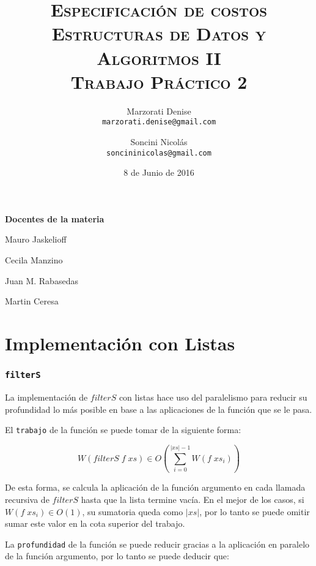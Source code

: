 \documentclass[a4paper,10pt]{article}
\author{
    Marzorati Denise \\
    \texttt{marzorati.denise@gmail.com}
    \and Soncini Nicolás \\
    \texttt{soncininicolas@gmail.com}
}
\date{
    8 de Junio de 2016
}
\title{
    \Huge \textsc{Especificación de costos} \\
    \large \textsc{Estructuras de Datos y Algoritmos II} \\
    \textsc{Trabajo Práctico 2}
}
\begin{document}
\bigskip
\bigskip
\bigskip

\maketitle

\thispagestyle{empty}

\begin{center}
\large \bf Docentes de la materia
\end{center}

\begin{center}
Mauro Jaskelioff

Cecila Manzino

Juan M. Rabasedas

Martin Ceresa
\end{center}

\newpage{}


\part*{Implementación con Listas}


\section*{\texttt{filterS}}

    La implementación de $filterS$ con listas hace uso del paralelismo para
reducir su profundidad lo más posible en base a las aplicaciones de la función 
que se le pasa.



    El \texttt{trabajo} de la función se puede tomar de la siguiente forma:

\begin{equation*}
    W \left(filterS\; f \;xs\right) \in
    O \left( \sum_{i=0}^{\vert xs \vert -1} W \left( f\; xs_i \right) \right)
\end{equation*}

De esta forma, se calcula la aplicación de la función argumento en cada
llamada recursiva de $filterS$ hasta que la lista termine vacía.
En el mejor de los casos, si $W \left( f\; xs_i \right) \in O \left( 1 \right)$,
su sumatoria queda como $\vert xs \vert$, por lo tanto se puede omitir sumar este valor
en la cota superior del trabajo.

\bigskip

La \texttt{profundidad} de la función se puede reducir gracias a la aplicación
en paralelo de la función argumento, por lo tanto se puede deducir que:
\end{document}
